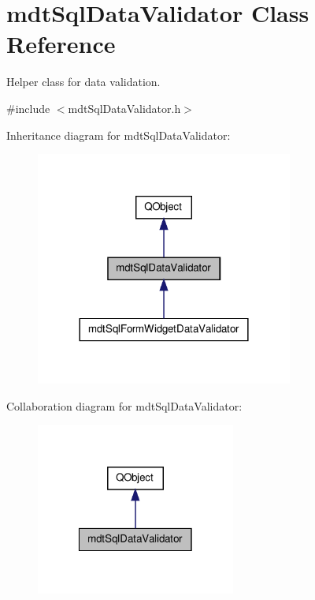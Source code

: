 \hypertarget{classmdt_sql_data_validator}{\section{mdt\-Sql\-Data\-Validator Class Reference}
\label{classmdt_sql_data_validator}
}


Helper class for data validation.  




{\ttfamily \#include $<$mdt\-Sql\-Data\-Validator.\-h$>$}



Inheritance diagram for mdt\-Sql\-Data\-Validator\-:\nopagebreak
\begin{figure}[H]
\begin{center}
\leavevmode
\includegraphics[width=240pt]{classmdt_sql_data_validator__inherit__graph}
\end{center}
\end{figure}


Collaboration diagram for mdt\-Sql\-Data\-Validator\-:\nopagebreak
\begin{figure}[H]
\begin{center}
\leavevmode
\includegraphics[width=186pt]{classmdt_sql_data_validator__coll__graph}
\end{center}
\end{figure}
